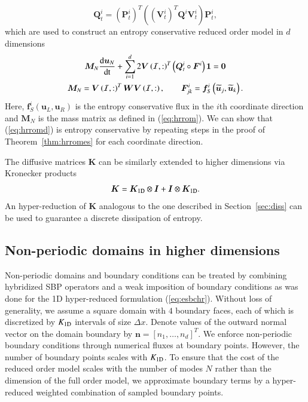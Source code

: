 \documentclass[preprint,10pt]{elsarticle}
\theoremstyle{definition}
\theoremstyle{lemma}
\theoremstyle{theorem}
\theoremstyle{assumption}
\renewcommand{\tilde}{\widetilde}
\newcommand{\td}[2]{\frac{{\rm d}#1}{{\rm d}{\rm #2}}}
\newcommand{\LRp}[1]{\left( #1 \right)}
\newcommand{\LRs}[1]{\left[ #1 \right]}
\begin{document}
\[
\bm{Q}_t^i = \LRp{\bm{P}^i_t}^T\LRp{\LRp{\bm{V}^i_t}^T\bm{Q}^i\bm{V}^i_t}\bm{P}^i_t,
\]
which are used to construct an entropy conservative reduced order model in $d$ dimensions
\begin{gather}
\bm{M}_N\td{\bm{u}_N}{t} + \sum_{i=1}^d 2\bm{V}\LRp{\mathcal{I},:}^T\LRp{\bm{Q}^i_t \circ \bm{F}^i}\bm{1} = \bm{0} \label{eq:hrromd}\\
\bm{M}_N = \bm{V}\LRp{\mathcal{I},:}^T\bm{W}\bm{V}\LRp{\mathcal{I},:}, \qquad \bm{F}^i_{jk} = \bm{f}^i_S\LRp{\tilde{\bm{u}}_j,\tilde{\bm{u}}_k}.\nonumber
\end{gather}
Here, $\bm{f}^i_S\LRp{\bm{u}_L,\bm{u}_R}$ is the entropy conservative flux in the $i$th coordinate direction and $\bm{M}_N$ is the mass matrix as defined in (\ref{eq:hrrom}).  We can show that (\ref{eq:hrromd}) is entropy conservative by repeating steps in the proof of Theorem~\ref{thm:hrromes} for each coordinate direction.  

The diffusive matrices $\bm{K}$ can be similarly extended to higher dimensions via Kronecker products
\[
\bm{K} = \bm{K}_{\rm 1D}\otimes \bm{I} + \bm{I}\otimes \bm{K}_{\rm 1D}.  
\]
An hyper-reduction of $\bm{K}$ analogous to the one described in Section~\ref{sec:diss} can be used to guarantee a discrete dissipation of entropy.  

\subsection{Non-periodic domains in higher dimensions}

Non-periodic domains and boundary conditions can be treated by combining hybridized SBP operators and a weak imposition of boundary conditions as was done for the 1D hyper-reduced formulation (\ref{eq:esbchr}).  Without loss of generality, we assume a square domain with $4$ boundary faces, each of which is discretized by $K_{\rm 1D}$ intervals of size $\Delta x$.  Denote values of the outward normal vector on the domain boundary by $\bm{n} = \LRs{n_1, \ldots, n_d}^T$.  We enforce non-periodic boundary conditions through numerical fluxes at boundary points.  However, the number of boundary points scales with $K_{\rm 1D}$.  To ensure that the cost of the reduced order model scales with the number of modes $N$ rather than the dimension of the full order model, we approximate boundary terms by a hyper-reduced weighted combination of sampled boundary points.  
\end{document}
